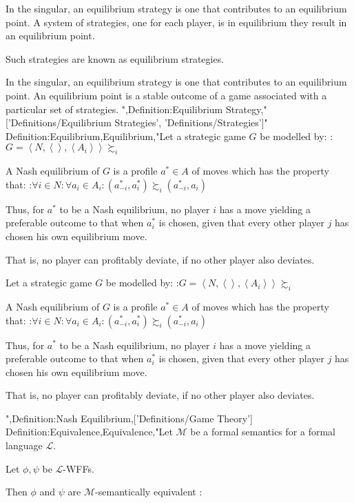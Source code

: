 In the singular, an equilibrium strategy is one that contributes to an equilibrium point.
A system of strategies, one for each player, is in equilibrium  they result in an equilibrium point.

Such strategies are known as equilibrium strategies.


In the singular, an equilibrium strategy is one that contributes to an equilibrium point.
An equilibrium point is a stable outcome of a game associated with a particular set of strategies.
",Definition:Equilibrium Strategy,"['Definitions/Equilibrium Strategies', 'Definitions/Strategies']"
Definition:Equilibrium,Equilibrium,"Let a strategic game $G$ be modelled by:
:$G = \left\langle N, \left\langle   \right\rangle, \left\langle A_i \right\rangle \right\rangle {\succsim_i}$


A Nash equilibrium of $G$ is a profile $a^* \in A$ of moves which has the property that:
:$\forall i \in N: \forall a_i \in A_i: \left( a^*_{-i}, a^*_i \right) \succsim_i \left( a^*_{-i}, a_i \right)$


Thus, for $a^*$ to be a Nash equilibrium, no player $i$ has a move yielding a preferable outcome to that when $a^*_i$ is chosen, given that every other player $j$ has chosen his own equilibrium move.

That is, no player can profitably deviate, if no other player also deviates.


Let a strategic game $G$ be modelled by:
:$G = \left\langle N, \left\langle   \right\rangle, \left\langle A_i \right\rangle \right\rangle {\succsim_i}$


A Nash equilibrium of $G$ is a profile $a^* \in A$ of moves which has the property that:
:$\forall i \in N: \forall a_i \in A_i: \left( a^*_{-i}, a^*_i \right) \succsim_i \left( a^*_{-i}, a_i \right)$


Thus, for $a^*$ to be a Nash equilibrium, no player $i$ has a move yielding a preferable outcome to that when $a^*_i$ is chosen, given that every other player $j$ has chosen his own equilibrium move.

That is, no player can profitably deviate, if no other player also deviates.


",Definition:Nash Equilibrium,['Definitions/Game Theory']
Definition:Equivalence,Equivalence,"Let $\mathscr M$ be a formal semantics for a formal language $\mathcal L$.

Let $\phi, \psi$ be $\mathcal L$-WFFs.


Then $\phi$ and $\psi$ are $\mathscr M$-semantically equivalent :

